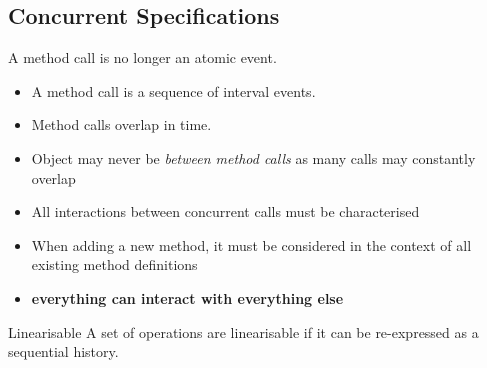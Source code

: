\subsection{Concurrent Specifications}
A method call is no longer an atomic event.
\begin{itemize}
	\item A method call is a sequence of interval events.
	\item Method calls overlap in time.
	\item Object may never be \textit{between method calls} as many calls may constantly overlap
	\item All interactions between concurrent calls must be characterised
	\item When adding a new method, it must be considered in the context of all existing method definitions
	\item \textbf{everything can interact with everything else}
\end{itemize}

\begin{definitionbox}{Linearisable}
	A set of operations are linearisable if it can be re-expressed as a sequential history.
\end{definitionbox}

